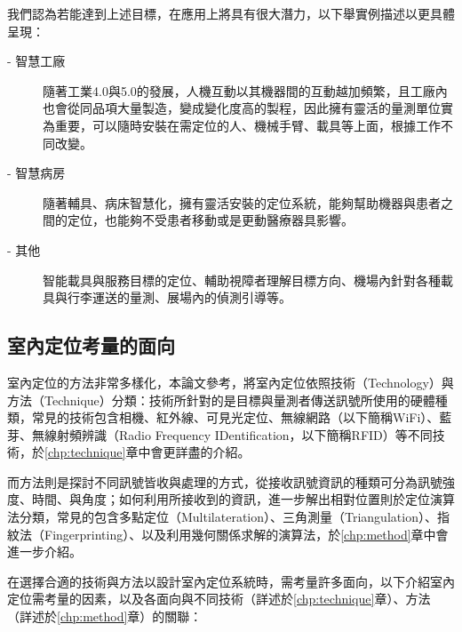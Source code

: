 我們認為若能達到上述目標，在應用上將具有很大潛力，以下舉實例描述以更具體呈現：
\begin{description}
    \item[- 智慧工廠] \hfill 
    
    \quad \quad 
    隨著工業4.0與5.0的發展，人機互動以其機器間的互動越加頻繁，且工廠內也會從同品項大量製造，變成變化度高的製程，因此擁有靈活的量測單位實為重要，可以隨時安裝在需定位的人、機械手臂、載具等上面，根據工作不同改變。

    \item[- 智慧病房] \hfill 
    
    \qquad
    隨著輔具、病床智慧化，擁有靈活安裝的定位系統，能夠幫助機器與患者之間的定位，也能夠不受患者移動或是更動醫療器具影響。
    
    \item[- 其他]  \hfill 
    
    \qquad
    智能載具與服務目標的定位、輔助視障者理解目標方向、機場內針對各種載具與行李運送的量測、展場內的偵測引導等。
\end{description}









\subsection{室內定位考量的面向}
\label{chp:intro}




室內定位的方法非常多樣化，本論文參考\cite{survey_indoor2018}，將室內定位依照技術（Technology）與方法（Technique）分類：技術所針對的是目標與量測者傳送訊號所使用的硬體種類，常見的技術包含相機、紅外線、可見光定位、無線網路（以下簡稱WiFi）、藍芽、無線射頻辨識（Radio Frequency IDentification，以下簡稱RFID）等不同技術，於\ref{chp:technique}章中會更詳盡的介紹。

而方法則是探討不同訊號皆收與處理的方式，從接收訊號資訊的種類可分為訊號強度、時間、與角度；如何利用所接收到的資訊，進一步解出相對位置則於定位演算法分類，常見的包含多點定位（Multilateration）、三角測量（Triangulation）、指紋法（Fingerprinting）、以及利用幾何關係求解的演算法，於\ref{chp:method}章中會進一步介紹。


在選擇合適的技術與方法以設計室內定位系統時，需考量許多面向，以下介紹室內定位需考量的因素，以及各面向與不同技術（詳述於\ref{chp:technique}章）、方法（詳述於\ref{chp:method}章）的關聯：

